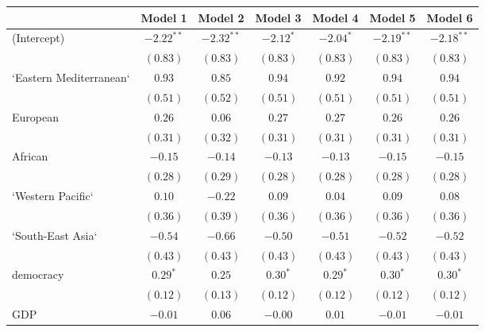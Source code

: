 
\begin{table}[!h]
\begin{center}
\begin{tabular}{l c c c c c c }
\toprule
 & Model 1 & Model 2 & Model 3 & Model 4 & Model 5 & Model 6 \\
\midrule
(Intercept)             & $-2.22^{**}$ & $-2.32^{**}$ & $-2.12^{*}$  & $-2.04^{*}$  & $-2.19^{**}$ & $-2.18^{**}$ \\
                        & $(0.83)$     & $(0.83)$     & $(0.83)$     & $(0.83)$     & $(0.83)$     & $(0.83)$     \\
`Eastern Mediterranean` & $0.93$       & $0.85$       & $0.94$       & $0.92$       & $0.94$       & $0.94$       \\
                        & $(0.51)$     & $(0.52)$     & $(0.51)$     & $(0.51)$     & $(0.51)$     & $(0.51)$     \\
European                & $0.26$       & $0.06$       & $0.27$       & $0.27$       & $0.26$       & $0.26$       \\
                        & $(0.31)$     & $(0.32)$     & $(0.31)$     & $(0.31)$     & $(0.31)$     & $(0.31)$     \\
African                 & $-0.15$      & $-0.14$      & $-0.13$      & $-0.13$      & $-0.15$      & $-0.15$      \\
                        & $(0.28)$     & $(0.29)$     & $(0.28)$     & $(0.28)$     & $(0.28)$     & $(0.28)$     \\
`Western Pacific`       & $0.10$       & $-0.22$      & $0.09$       & $0.04$       & $0.09$       & $0.08$       \\
                        & $(0.36)$     & $(0.39)$     & $(0.36)$     & $(0.36)$     & $(0.36)$     & $(0.36)$     \\
`South-East Asia`       & $-0.54$      & $-0.66$      & $-0.50$      & $-0.51$      & $-0.52$      & $-0.52$      \\
                        & $(0.43)$     & $(0.43)$     & $(0.43)$     & $(0.43)$     & $(0.43)$     & $(0.43)$     \\
democracy               & $0.29^{*}$   & $0.25$       & $0.30^{*}$   & $0.29^{*}$   & $0.30^{*}$   & $0.30^{*}$   \\
                        & $(0.12)$     & $(0.13)$     & $(0.12)$     & $(0.12)$     & $(0.12)$     & $(0.12)$     \\
GDP                     & $-0.01$      & $0.06$       & $-0.00$      & $0.01$       & $-0.01$      & $-0.01$      \\

\end{tabular}
\end{center}
\end{table}
